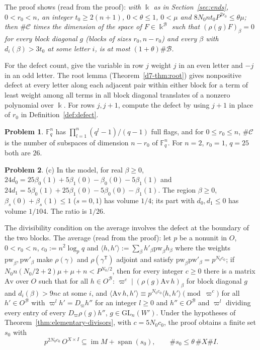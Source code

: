 \documentclass[reqno]{amsart}
\numberwithin{equation}{section}
\theoremstyle{plain}
\theoremstyle{definition}
\newtheorem{problem}{Problem}[section]
\theoremstyle{remark}
\newcommand{\F}{\mathbb{F}}
\newcommand{\GL}{\mathrm{GL}}
\newcommand{\Bc}{\mathcal B}
\newcommand{\Cc}{\mathcal C}
\begin{document}
The proof shows (read from the proof): \emph{with \(\Bbbk\) as in Section~\ref{sec:ends}, \(0 < r_0 < n\), an integer \(t_0 \ge 2(n+1)\), \(0 < \theta \le 1\), \(0 < \mu\) and \(8N_0nt_0P^{2r_0} \le \theta\mu\); then \(\#\Cc\) times the dimension of the space of \(F \in \Bbbk^{\Bc}\) such that \((\rho(g)F)_\beta = 0\) for every block diagonal \(g\) (blocks of sizes \(r_0, n - r_0\)) and every \(\beta\) with \(d_i(\beta) > 3t_0\) at some letter \(i\), is at most \((1 + \theta)\#\Bc\).}

For the defect count, give the variable in row \(j\) weight \(j\) in an even letter and \(-j\) in an odd letter.  The root lemma (Theorem~\ref{d7-thm:root}) gives nonpositive defect at every letter along each adjacent pair within either block for a term of least weight among all terms in all block diagonal translates of a nonzero polynomial over \(\Bbbk\).  For rows \(j,j+1\), compute the defect by using \(j+1\) in place of \(r_0\) in Definition~\ref{def:defect}.

\begin{problem}\label{pr:flags}
\(\F_q^n\) has \(\prod_{l=1}^n (q^l - 1)/(q - 1)\) full flags, and for \(0 \le r_0 \le n\), \(\#\Cc\) is the number of subspaces of dimension \(n - r_0\) of \(\F_q^n\).  For \(n = 2\), \(r_0 = 1\), \(q = 25\) both are \(26\).
\end{problem}

\begin{problem}\label{pr:cone}
(c) In the model, for real \(\beta \ge 0\), \(24d_0 = 25\beta_0(1) + 5\beta_1(0) - \beta_0(0) - 5\beta_1(1)\) and \(24d_1 = 5\beta_0(1) + 25\beta_1(0) - 5\beta_0(0) - \beta_1(1)\).  The region \(\beta \ge 0\), \(\beta_s(0) + \beta_s(1) \le 1\) (\(s = 0, 1\)) has volume \(1/4\); its part with \(d_0, d_1 \le 0\) has volume \(1/104\).  The ratio is \(1/26\).
\end{problem}

The divisibility condition on the average involves the defect at the boundary of the two blocks. The average (read from the proof): let \(p\) be a nonunit in \(O\), \(0 < r_0 < n\), \(c_0 := n^2\log_p q\) and \(\langle h, h'\rangle := \sum_\beta h'_\beta \mathrm{pw}_\beta h_\beta\) where the weights \(\mathrm{pw}_\beta, \mathrm{pw}'_\beta\) make \(\rho(\gamma)\) and \(\rho(\gamma^{\mathsf T})\) adjoint and satisfy \(\mathrm{pw}_\beta\mathrm{pw}'_\beta = p^{N_0c_0}\); if \(N_0n(N_0/2 + 2)\mu + \mu + n < P^{N_0/2}\), then for every integer \(c \ge 0\) there is a matrix \(\mathrm{Av}\) over \(O\) such that for all \(h \in O^{\Bc}\): \(\varpi^c \mid (\rho(g)\mathrm{Av}\,h)_\beta\) for block diagonal \(g\) and \(d_i(\beta) > 9nc\) at some \(i\), and \(\langle \mathrm{Av}\,h, h'\rangle \equiv p^{N_0c_0}\langle h, h'\rangle \pmod{\varpi^c}\) for all \(h' \in O^{\Bc}\) with \(\varpi^lh' = D_\varpi h''\) for an integer \(l \ge 0\) and \(h'' \in O^{\Bc}\) and \(\varpi^l\) dividing every entry of every \(D_\varpi\rho(g)h''\), \(g \in \GL_n(W')\).  Under the hypotheses of Theorem~\ref{thm:elementary-divisors}, with \(c = 5N_0c_0\), the proof obtains a finite set \(s_0\) with
\[
  p^{2N_0c_0}\,O^{X \times I} \subseteq \operatorname{im}M + \operatorname{span}(s_0), \qquad \#s_0 \le \theta\,\#X\#I .
\]
\end{document}
